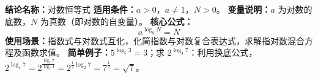 \textbf{结论名称：}对数恒等式
\textbf{适用条件：}$a>0$，$a \neq 1$，$N>0$。
\textbf{变量说明：}$a$ 为对数的底数，$N$ 为真数（即对数的自变量）。
\textbf{核心公式：}\[\boxed{a^{\log_a N}=N}\]
\textbf{使用场景：}指数式与对数式互化，化简指数与对数复合表达式，求解指对数混合方程及函数求值。
\textbf{简单例子：}$5^{\log_5 3}=3$；求 $2^{\log_4 7}$：利用换底公式，$2^{\log_4 7}=2^{\frac{\log_2 7}{\log_2 4}}=2^{\frac{1}{2}\log_2 7}=7^{\frac12}=\sqrt{7}$。